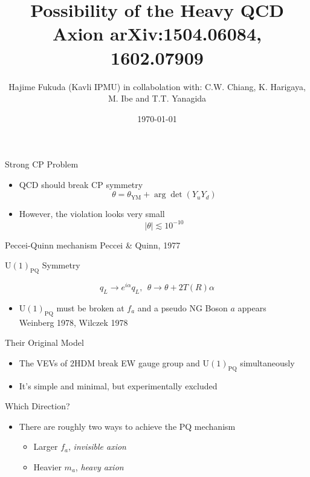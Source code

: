 \documentclass[17pt,ignorenonframetext,]{beamer}
\title{Possibility of the Heavy QCD Axion \hfil\tiny arXiv:1504.06084,
1602.07909}
\author{Hajime Fukuda (Kavli IPMU) \newline\scriptsize in collabolation with:
C.W. Chiang, K. Harigaya, M. Ibe and T.T. Yanagida}
\date{\today}
\providecommand{\tightlist}{%
  \setlength{\itemsep}{0pt}\setlength{\parskip}{0pt}}
\begin{document}
\frame{\titlepage}

\begin{frame}{Strong CP Problem}

\begin{itemize}
\tightlist
\item
  QCD should break CP symmetry \[
  \theta = \theta_\text{YM} + \arg\det(Y_uY_d)
  \]
\item
  However, the violation looks very small \[
  |\theta| \lesssim 10^{-10}
  \]
\end{itemize}

\end{frame}

\begin{frame}{Peccei-Quinn mechanism \tiny Peccei \& Quinn, 1977}

\begin{block}{\(\text{U}(1)_\text{PQ}\) Symmetry}

\[
q_L\to e^{i\alpha} q_L,\ \ \theta\to\theta+2T(R)\alpha
\]

\begin{itemize}
\tightlist
\item
  \(\text{U}(1)_\text{PQ}\) must be broken at \(f_a\) and a pseudo NG
  Boson \(a\) appears\\
  \hfill \tiny Weinberg 1978, Wilczek 1978
\end{itemize}

\end{block}

\end{frame}

\begin{frame}{Their Original Model}

\begin{itemize}
\tightlist
\item
  The VEVs of 2HDM break EW gauge group and \(\text{U}(1)_\text{PQ}\)
  simultaneously
\item
  It's simple and minimal, but experimentally excluded
\end{itemize}

\end{frame}

\begin{frame}{Which Direction?}

\begin{itemize}
\tightlist
\item
  There are roughly two ways to achieve the PQ mechanism

  \begin{itemize}
  \tightlist
  \item
    Larger \(f_a\), \emph{invisible axion}
  \item
    Heavier \(m_a\), \emph{heavy axion}
  \end{itemize}
\end{itemize}

\end{frame}
\end{document}
